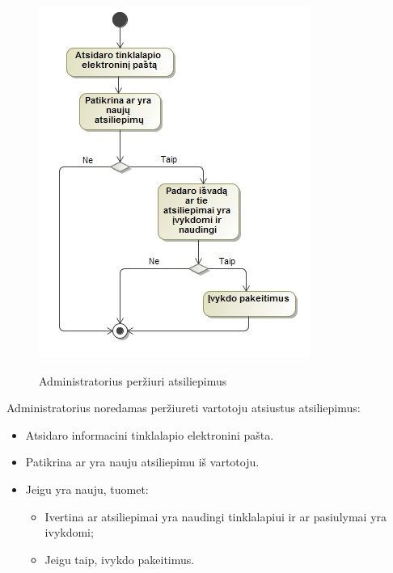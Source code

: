 ﻿\documentclass{VUMIFPSkursinis}
\begin{document}
\begin{figure}[H]
    \centering
    \includegraphics[scale=0.7]{img/geri/adminFeed}
    \label{img:uml15_5}
	\caption{Administratorius peržiuri atsiliepimus}
\end{figure}

Administratorius noredamas peržiureti vartotoju atsiustus atsiliepimus:
\begin{itemize}
\item Atsidaro informacini tinklalapio elektronini pašta.
\item Patikrina ar yra nauju atsiliepimu iš vartotoju.
\item Jeigu yra nauju, tuomet:
\begin{itemize}
\item Ivertina ar atsiliepimai yra naudingi tinklalapiui ir ar pasiulymai yra ivykdomi;
\item Jeigu taip, ivykdo pakeitimus.
\end{itemize}
\end{itemize}
\end{document}

